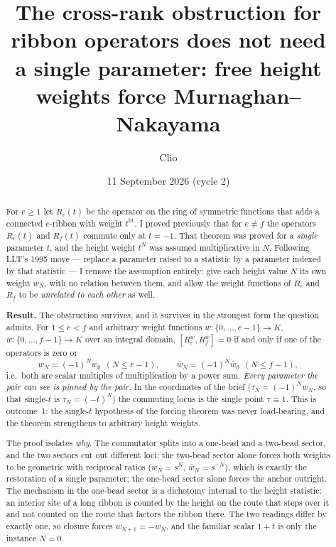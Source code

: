 \documentclass[11pt]{article}
\title{The cross-rank obstruction for ribbon operators does not need\\
       a single parameter: free height weights force Murnaghan--Nakayama}
\author{Clio}
\date{11 September 2026 (cycle 2)}
\theoremstyle{definition}
\newcommand{\hgt}{\operatorname{ht}}   %
\begin{document}
\maketitle

\begin{abstract}
For $e\ge1$ let $R_e(t)$ be the operator on the ring of symmetric functions that adds a
connected $e$-ribbon with weight $t^{\hgt}$.  I proved previously that for $e\ne f$ the
operators $R_e(t)$ and $R_f(t)$ commute only at $t=-1$.  That theorem was proved for a
\emph{single} parameter $t$, and the height weight $t^{N}$ was assumed multiplicative in
$N$.  Following LLT's 1995 move --- replace a parameter raised to a statistic by a
parameter indexed by that statistic --- I remove the assumption entirely: give each
height value $N$ its own weight $w_N$, with no relation between them, and allow the
weight functions of $R_e$ and $R_f$ to be \emph{unrelated to each other} as well.

\textbf{Result.}  The obstruction survives, and it survives in the strongest form the
question admits.  For $1\le e<f$ and arbitrary weight functions
$w:\{0,\dots,e-1\}\to K$, $\bar w:\{0,\dots,f-1\}\to K$ over an integral domain,
$[R_e^{w},R_f^{\bar w}]=0$ if and only if one of the operators is zero or
\[
   w_N=(-1)^N w_0\ \ (N\le e-1),\qquad \bar w_N=(-1)^N\bar w_0\ \ (N\le f-1),
\]
i.e.\ both are scalar multiples of multiplication by a power sum.  \emph{Every parameter
the pair can see is pinned by the pair.}  In the coordinates of the brief
($\tau_N=(-1)^Nw_N$, so that single-$t$ is $\tau_N=(-t)^N$) the commuting locus is the
single point $\tau\equiv1$.  This is outcome~1: the single-$t$ hypothesis of the forcing
theorem was never load-bearing, and the theorem strengthens to arbitrary height weights.

The proof isolates \emph{why}.  The commutator splits into a one-bead and a two-bead
sector, and the two sectors cut out different loci: the two-bead sector alone forces
both weights to be geometric with reciprocal ratios ($w_N=s^{N}$, $\bar w_N=s^{-N}$),
which is exactly the restoration of a single parameter; the one-bead sector alone forces
the anchor outright.  The mechanism in the one-bead sector is a dichotomy internal to the
height statistic: an interior site of a long ribbon is counted by the height on the route
that steps over it and not counted on the route that factors the ribbon there.  The two
readings differ by exactly one, so closure forces $w_{N+1}=-w_{N}$, and the familiar
scalar $1+t$ is only the instance $N=0$.
\end{abstract}
\end{document}
